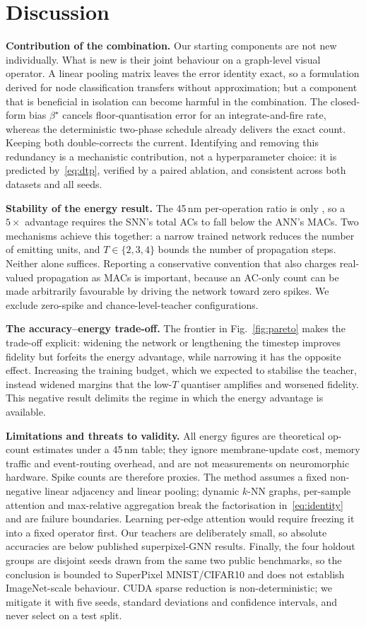 \section{Discussion}
\label{sec:discussion}

\textbf{Contribution of the combination.} Our starting components are not new individually. What is new is their joint behaviour on a graph-level visual operator. A linear pooling matrix leaves the error identity exact, so a formulation derived for node classification transfers without approximation; but a component that is beneficial in isolation can become harmful in the combination. The closed-form bias $\beta^\star$ cancels floor-quantisation error for an integrate-and-fire rate, whereas the deterministic two-phase schedule already delivers the exact count. Keeping both double-corrects the current. Identifying and removing this redundancy is a mechanistic contribution, not a hyperparameter choice: it is predicted by~\eqref{eq:dtp}, verified by a paired ablation, and consistent across both datasets and all seeds.

\textbf{Stability of the energy result.} The 45\,nm per-operation ratio is only \MACACRatio, so a $5\times$ advantage requires the SNN's total ACs to fall below the ANN's MACs. Two mechanisms achieve this together: a narrow trained network reduces the number of emitting units, and $T\in\{2,3,4\}$ bounds the number of propagation steps. Neither alone suffices. Reporting a conservative convention that also charges real-valued propagation as MACs is important, because an AC-only count can be made arbitrarily favourable by driving the network toward zero spikes. We exclude zero-spike and chance-level-teacher configurations.

\textbf{The accuracy--energy trade-off.} The frontier in Fig.~\ref{fig:pareto} makes the trade-off explicit: widening the network or lengthening the timestep improves fidelity but forfeits the energy advantage, while narrowing it has the opposite effect. Increasing the training budget, which we expected to stabilise the teacher, instead widened margins that the low-$T$ quantiser amplifies and worsened fidelity. This negative result delimits the regime in which the energy advantage is available.

\textbf{Limitations and threats to validity.} All energy figures are theoretical op-count estimates under a 45\,nm table; they ignore membrane-update cost, memory traffic and event-routing overhead, and are not measurements on neuromorphic hardware. Spike counts are therefore proxies. The method assumes a fixed non-negative linear adjacency and linear pooling; dynamic $k$-NN graphs, per-sample attention and max-relative aggregation break the factorisation in~\eqref{eq:identity} and are failure boundaries. Learning per-edge attention would require freezing it into a fixed operator first. Our teachers are deliberately small, so absolute accuracies are below published superpixel-GNN results. Finally, the four holdout groups are disjoint seeds drawn from the same two public benchmarks, so the conclusion is bounded to SuperPixel MNIST/CIFAR10 and does not establish ImageNet-scale behaviour. CUDA sparse reduction is non-deterministic; we mitigate it with five seeds, standard deviations and confidence intervals, and never select on a test split.
